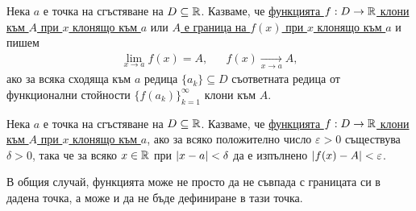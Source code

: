 \documentclass[numbers=endperiod, DIV=15, bibliography=totocnumbered]{scrartcl}
\begin{document}
\begin{definition}
  Нека $a$ е точка на сгъстяване на $D \subseteq \mathbb{R}$. Казваме, че \uline{функцията $f: D \to \mathbb{R}$ клони към $A$ при $x$ клонящо към $a$} или \uline{$A$ е граница на $f(x)$ при $x$ клонящо към $a$} и пишем
  \begin{align*}
    \lim_{x \to a} f(x) = A,
    &&
    f(x) \underset {x \to a} \longrightarrow A,
  \end{align*}
  ако за всяка сходяща към $a$ редица $\{ a_k \} \subseteq D$ съответната редица от функционални стойности ${\{ f(a_k) \}}_{k=1}^\infty$ клони към $A$.
\end{definition}

\begin{definition}
  Нека $a$ е точка на сгъстяване на $D \subseteq \mathbb{R}$. Казваме, че \uline{функцията $f: D \to \mathbb{R}$ клони към $A$ при $x$ клонящо към $a$}, ако за всяко положително число $\varepsilon > 0$ съществува $\delta > 0$, така че за всяко $x \in \mathbb{R}$ при $\left\vert x - a \right\vert < \delta$ да е изпълнено $\left\vert f(x) - A \right\vert < \varepsilon$.
\end{definition}

\begin{note}
  В общия случай, функцията може не просто да не съвпада с границата си в дадена точка, а може и да не бъде дефиниране в тази точка.
\end{note}
\end{document}
